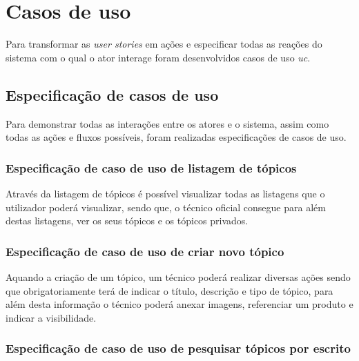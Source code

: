 \section{Casos de uso}
Para transformar as \textit{user stories} em ações e especificar todas as reações do sistema com o qual o ator interage foram desenvolvidos casos de uso \textit{\acrfull{uc}}.


\newpage

\subsection{Especificação de casos de uso}

Para demonstrar todas as interações entre os atores e o sistema, assim como todas as ações e fluxos possíveis, foram realizadas especificações de casos de uso.

\subsubsection{Especificação de caso de uso de listagem de tópicos}

Através da listagem de tópicos é possível visualizar todas as listagens que o utilizador poderá visualizar, sendo que, o técnico oficial consegue para além destas listagens, ver os seus tópicos e os tópicos privados.

%



\newpage

\subsubsection{Especificação de caso de uso de criar novo tópico}

Aquando a criação de um tópico, um técnico poderá realizar diversas ações sendo que obrigatoriamente terá de indicar o título, descrição e tipo de tópico, para além desta informação o técnico poderá anexar imagens, referenciar um produto e indicar a visibilidade.



\newpage

\subsubsection{Especificação de caso de uso de pesquisar tópicos por escrito}

